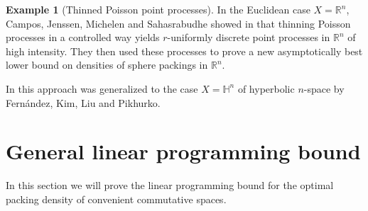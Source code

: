\documentclass[12pt,reqno,a4paper]{amsart}
\theoremstyle{theorem}
\theoremstyle{definition}
\newtheorem{example}[theorem]{Example}
\numberwithin{theorem}{section}
\numberwithin{equation}{section}
\newcommand{\R}{\mathbb{R}}
\begin{document}
\begin{example}[Thinned Poisson point processes]
In the Euclidean case $X=\R^n$, Campos, Jenssen, Michelen and Sahasrabudhe showed in \cite{EuclideanLowerArXiv} that thinning Poisson processes in a controlled way yields $r$-uniformly discrete point processes in $\R^n$ of high intensity. They then used these processes to prove a new asymptotically best lower bound on densities of sphere packings in $\R^n$.

In \cite{HyperbolicLowerArXiv} this approach was generalized to the case $X=\mathbb{H}^n$ of hyperbolic $n$-space by Fernández, Kim, Liu and Pikhurko.
\end{example}
\section{General linear programming bound}\label{s:bounds}
In this section we will prove the linear programming bound for the optimal packing density of convenient commutative spaces.
\end{document}
